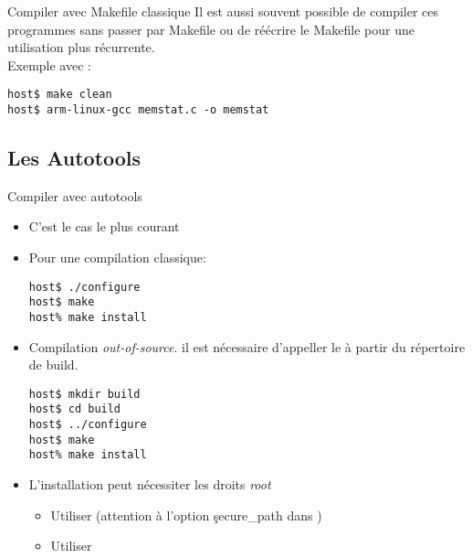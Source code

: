 \begin{frame}[fragile=singleslide]{Compiler avec Makefile classique}
  Il est aussi souvent possible de compiler ces programmes sans passer
  par Makefile  ou de réécrire  le Makefile pour une  utilisation plus
  récurrente.
  \\[2ex]
  Exemple avec :
\begin{lstlisting}
host$ make clean
host$ arm-linux-gcc memstat.c -o memstat
\end{lstlisting} %
\end{frame}

\subsection{Les Autotools}

\begin{frame}[fragile=singleslide]{Compiler avec autotools}
  \begin{itemize}
  \item C'est le cas le plus courant
  \item Pour une compilation classique:
    \begin{lstlisting}
host$ ./configure
host$ make
host% make install
    \end{lstlisting} %
  \item Compilation \emph{out-of-source}. il est nécessaire d'appeller
    le  à partir du répertoire de build.
    \begin{lstlisting}
host$ mkdir build
host$ cd build
host$ ../configure
host$ make
host% make install
    \end{lstlisting} %
  \item L'installation peut nécessiter les droits \emph{root}
    \begin{itemize}
    \item Utiliser  (attention à l'option \c{secure_path}
      dans )
    \item Utiliser 
    \end{itemize}
  \end{itemize}
\end{frame}

